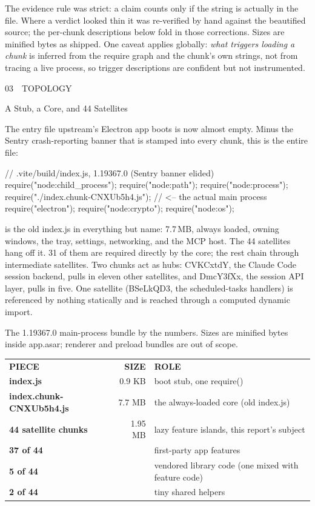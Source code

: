 \documentclass[11pt]{article}
\newcommand{\mono}{\ttfamily}
\newcommand{\reppar}[1]{{\fontsize{10.5}{15.2}\selectfont #1\par}\vspace{8pt}}
\newcommand{\code}[1]{{\mono\small #1}}
\newcommand{\reportsection}[3]{%
  \vspace{14pt}%
  {\mono\footnotesize\color{baseMid}\addfontfeatures{LetterSpace=8.0}\MakeUppercase{#1\, \textbullet\, #2}}\par
  \vspace{3pt}%
  {\heavy\fontsize{17}{19}\selectfont\color{base900} #3\par}
  \vspace{4pt}{\color{accent}\hrule height 1.6pt}\vspace{9pt}%
}
\newcommand{\tabcap}[1]{{\mono\color{faint}\fontsize{8.4}{11}\selectfont #1\par}\vspace{5pt}}
\newcommand{\thd}[1]{{\mono\bfseries\footnotesize\color{white}\MakeUppercase{#1}}}
\newcommand{\thdr}[1]{\multicolumn{1}{r}{\thd{#1}}}
\newcommand{\tname}[1]{\textbf{\color{base700}#1}}
\newcommand{\pct}[1]{{\mono\color{faint}\small #1}}
\begin{document}
\reppar{The evidence rule was strict: a claim counts only if the string is actually in the file. Where a verdict looked thin it was re-verified by hand against the beautified source; the per-chunk descriptions below fold in those corrections. Sizes are minified bytes as shipped. One caveat applies globally: \textit{what triggers loading a chunk} is inferred from the require graph and the chunk's own strings, not from tracing a live process, so trigger descriptions are confident but not instrumented.}

\reportsection{03}{Topology}{A Stub, a Core, and 44 Satellites}

\reppar{The entry file upstream's Electron app boots is now almost empty. Minus the Sentry crash-reporting banner that is stamped into every chunk, this is the entire file:}

\begin{codeblock}
// .vite/build/index.js, 1.19367.0 (Sentry banner elided)
require("node:child_process"); require("node:path");
require("node:process");
require("./index.chunk-CNXUb5h4.js");   // <-- the actual main process
require("electron"); require("node:crypto"); require("node:os");
\end{codeblock}

\reppar{\code{index.chunk-CNXUb5h4.js} is the old \code{index.js} in everything but name: 7.7\,MB, always loaded, owning windows, the tray, settings, networking, and the MCP host. The 44 satellites hang off it. 31 of them are required directly by the core; the rest chain through intermediate satellites. Two chunks act as hubs: \code{CVKCxtdY}, the Claude Code session backend, pulls in eleven other satellites, and \code{DmcY3fXx}, the session API layer, pulls in five. One satellite (\code{BSeLkQD3}, the scheduled-tasks handlers) is referenced by nothing statically and is reached through a computed dynamic import.}

\begin{table}[H]
\tabcap{The 1.19367.0 main-process bundle by the numbers. Sizes are minified bytes inside app.asar; renderer and preload bundles are out of scope.}
\setlength{\tabcolsep}{7pt}\renewcommand{\arraystretch}{1.3}
\noindent\begin{tabular}{@{}l r l@{}}
\rowcolor{base800}
\thd{Piece} & \thdr{Size} & \thd{Role} \\
\tname{index.js} & \pct{0.9 KB} & boot stub, one require() \\
\tname{index.chunk-CNXUb5h4.js} & \pct{7.7 MB} & the always-loaded core (old index.js) \\
\tname{44 satellite chunks} & \pct{1.95 MB} & lazy feature islands, this report's subject \\
\tname{37 of 44} & \pct{} & first-party app features \\
\tname{5 of 44} & \pct{} & vendored library code (one mixed with feature code) \\
\tname{2 of 44} & \pct{} & tiny shared helpers \\
\end{tabular}
\end{table}
\end{document}
